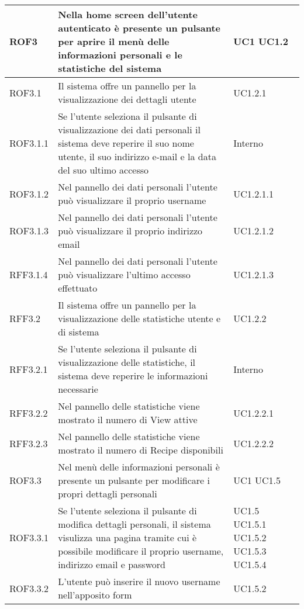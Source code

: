 \begin{center}
\begin{longtable}{| p{2.5cm} | p{8cm} | p{2cm} |}
		ROF3  &  Nella home screen dell'utente autenticato è presente un pulsante per aprire il menù delle informazioni personali e le statistiche del sistema  & UC1 \newline UC1.2 \\
		\hline
		ROF3.1  &  Il sistema offre un pannello per la visualizzazione dei dettagli utente &  UC1.2.1 \\
		\hline
		ROF3.1.1  &  Se l'utente seleziona il pulsante di visualizzazione dei dati personali il sistema deve reperire il suo nome utente, il suo indirizzo e-mail e la data del suo ultimo accesso &  Interno \\
		\hline
		ROF3.1.2  &  Nel pannello dei dati personali l'utente può visualizzare il proprio username  &  UC1.2.1.1 \\
		\hline
		ROF3.1.3  &  Nel pannello dei dati personali l'utente può visualizzare il proprio indirizzo email  &  UC1.2.1.2 \\
		\hline
		RFF3.1.4  &  Nel pannello dei dati personali l'utente può visualizzare l'ultimo accesso effettuato  &  UC1.2.1.3 \\
		\hline
		RFF3.2  &  Il sistema offre un pannello per la visualizzazione delle statistiche utente e di sistema  &  UC1.2.2 \\
		\hline
		RFF3.2.1  &  Se l'utente seleziona il pulsante di visualizzazione delle statistiche, il sistema deve reperire le informazioni necessarie  &  Interno \\
		\hline
		RFF3.2.2 &  Nel pannello delle statistiche viene mostrato il numero di View attive &  UC1.2.2.1 \\
		\hline
		RFF3.2.3  &  Nel pannello delle statistiche viene mostrato il numero di Recipe disponibili &  UC1.2.2.2 \\
		\hline
		ROF3.3  &  Nel menù delle informazioni personali è presente un pulsante per modificare i propri dettagli personali & UC1 \newline UC1.5 \\
		\hline
		ROF3.3.1  &  Se l'utente seleziona il pulsante di modifica dettagli personali, il sistema visulizza una pagina tramite cui è possibile modificare il proprio username, indirizzo email e password &  UC1.5 \newline UC1.5.1 \newline UC1.5.2 \newline UC1.5.3 \newline UC1.5.4 \\
		\hline
		ROF3.3.2  &  L'utente può inserire il nuovo username nell'apposito form  &  UC1.5.2 \\

\end{longtable}
\end{center}
